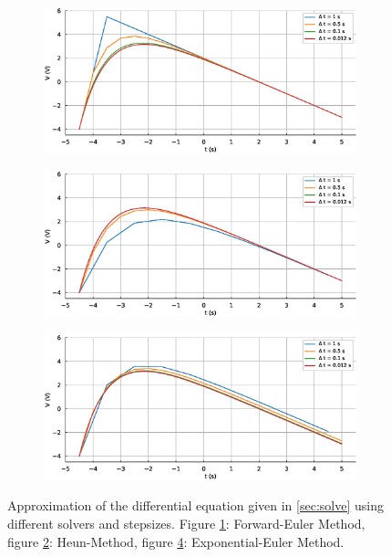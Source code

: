 \documentclass{scrartcl}			%
\begin{document}
\begin{figure}[H]	
	\centering
	\begin{subfigure}[b]{\textwidth}			%
		\includegraphics[width=1\linewidth]{imgs/forwardEul.eps}
		\caption{}
		\label{fig:forwardEul} %
	\end{subfigure}

	\begin{subfigure}[b]{\textwidth}					%
		\includegraphics[width=1\linewidth]{imgs/heun.eps}
		\caption{}
		\label{fig:heun} %
	\end{subfigure}
	
	\begin{subfigure}[b]{\textwidth}					%
		\includegraphics[width=1\linewidth]{imgs/expo.eps}
		\caption{}
		\label{fig:expo} %
	\end{subfigure}
	\caption{Approximation of the differential equation given in \ref{sec:solve} using different solvers and stepsizes. Figure \ref{fig:forwardEul}: Forward-Euler Method,  figure \ref{fig:heun}: Heun-Method, figure \ref{fig:expo}: Exponential-Euler Method.}
\end{figure}
\pagebreak
\end{document}
